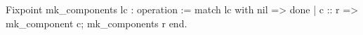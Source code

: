 Fixpoint mk_components lc : operation :=
 match lc with
  nil    => done
| c :: r => mk_component c; mk_components r
end.